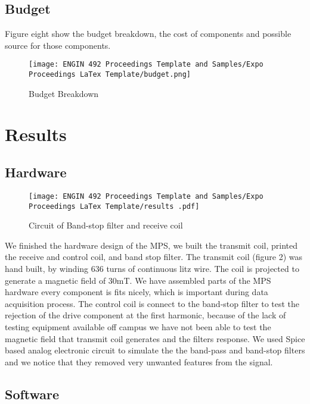 \documentclass[fleqn,10pt]{document} %
\begin{document}
	

\subsection{Budget}
Figure eight show the budget breakdown, the cost of components and possible source for those components. 
	
	\begin{figure}[ht]
	    \centering
	    \texttt{[image: ENGIN 492 Proceedings Template and Samples/Expo Proceedings LaTex Template/budget.png]}
	    \caption{Budget Breakdown}
	    \label{table:budget}
	\end{figure}
	
	\section{Results}
	\subsection{Hardware}
	
	\begin{figure}[ht]
	    \centering
	    \texttt{[image: ENGIN 492 Proceedings Template and Samples/Expo Proceedings LaTex Template/results .pdf]}
	    \caption{Circuit of Band-stop filter and receive coil}
	    \label{fig:results}
	\end{figure}

We finished the hardware design of the MPS, we built the transmit coil, printed the receive and control coil, and band stop filter. The transmit  coil (figure 2) was hand built, by winding 636 turns of continuous litz wire. The coil is projected to generate a magnetic field of 30mT. We have assembled parts of the MPS hardware every component is fits nicely, which is important during data acquisition process. The control coil is connect to the band-stop filter to test the rejection of the drive component at the first harmonic, because of the lack of testing equipment available off campus we have not been able to test the magnetic field that transmit coil generates and the filters response. We used Spice based analog electronic circuit to simulate the the band-pass and band-stop filters and we notice that they removed very unwanted features from the signal.


\subsection{Software}
\end{document}
